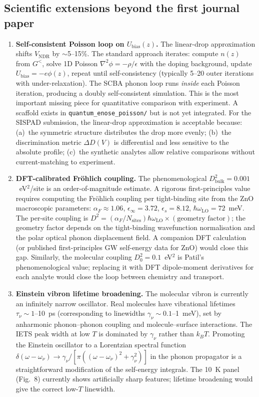 \documentclass[11pt,a4paper,onecolumn]{article}
\newcommand{\code}[1]{\texttt{\small #1}}
\begin{document}
\subsection{Scientific extensions beyond the first journal paper}
\begin{enumerate}[leftmargin=1.3em,itemsep=4pt]
\item \textbf{Self-consistent Poisson loop on $U_{\mathrm{bias}}(z)$.}
The linear-drop approximation shifts $V_{\mathrm{NDR}}$ by $\sim$5--15\%.
The standard approach iterates: compute $n(z)$ from $G^<$, solve 1D
Poisson $\nabla^2\phi = -\rho/\epsilon$ with the doping background, update
$U_{\mathrm{bias}} = -e\phi(z)$, repeat until self-consistency (typically
5--20 outer iterations with under-relaxation). The SCBA phonon loop runs
\emph{inside} each Poisson iteration, producing a doubly self-consistent
simulation. This is the most important missing piece for quantitative
comparison with experiment. A scaffold exists in
\code{quantum\_enose\_poisson/} but is not yet integrated. For the SISPAD
submission, the linear-drop approximation is acceptable because:
(a)~the symmetric structure distributes the drop more evenly;
(b)~the discrimination metric $\Delta D(V)$ is differential and less
sensitive to the absolute profile; (c)~the synthetic analytes allow
relative comparisons without current-matching to experiment.

\item \textbf{DFT-calibrated Fr\"ohlich coupling.}
The phenomenological $D^2_{\mathrm{bulk}} = 0.001$~eV$^2$/site is an
order-of-magnitude estimate. A rigorous first-principles value requires
computing the Fr\"ohlich coupling per tight-binding site from the ZnO
macroscopic parameters: $\alpha_F \approx 1.06$,
$\epsilon_\infty = 3.72$, $\epsilon_s = 8.12$,
$\hbar\omega_{\mathrm{LO}} = 72$~meV. The per-site coupling is
$D^2 = (\alpha_F / N_{\mathrm{sites}}) \hbar\omega_{\mathrm{LO}} \times
(\text{geometry factor})$; the geometry factor depends on the
tight-binding wavefunction normalisation and the polar optical phonon
displacement field. A companion DFT calculation (or published
first-principles GW self-energy data for ZnO) would close this gap.
Similarly, the molecular coupling $D_0^2 = 0.1$~eV$^2$ is Patil's
phenomenological value; replacing it with DFT dipole-moment derivatives
for each analyte would close the loop between chemistry and transport.

\item \textbf{Einstein vibron lifetime broadening.}
The molecular vibron is currently an infinitely narrow oscillator. Real
molecules have vibrational lifetimes $\tau_\nu \sim 1$--10~ps
(corresponding to linewidths $\gamma_\nu \sim 0.1$--1~meV), set by
anharmonic phonon--phonon coupling and molecule--surface interactions. The
IETS peak width at low $T$ is dominated by $\gamma_\nu$ rather than
$k_BT$. Promoting the Einstein oscillator to a Lorentzian spectral
function $\delta(\omega - \omega_\nu) \to
\gamma_\nu/[\pi((\omega-\omega_\nu)^2 + \gamma_\nu^2)]$ in the phonon
propagator is a straightforward modification of the self-energy
integrals. The 10~K panel (Fig.~8) currently shows artificially sharp
features; lifetime broadening would give the correct low-$T$ linewidth.


\end{enumerate}
\end{document}
